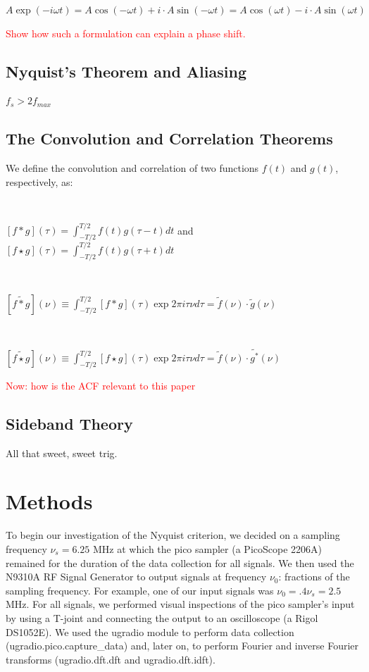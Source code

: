 \documentclass[a4paper]{article}
\begin{document}
$A\exp(-i \omega t) = A \cos(-\omega t) + i \cdot A \sin(-\omega t) = A \cos(\omega t) - i \cdot A \sin(\omega t)$

\textcolor{red}{Show how such a formulation can explain a phase shift.}

\subsection{Nyquist's Theorem and Aliasing}

$f_s > 2 f_{max}$

\subsection{The Convolution and Correlation Theorems}

We define the convolution and correlation of two functions $f(t)$ and $g(t)$, respectively, as:

\

$[f * g](\tau) = \int_{-T / 2}^{T / 2} f(t) g(\tau - t) dt$ and $[f \star g](\tau) = \int_{-T / 2}^{T / 2} f(t) g(\tau + t) dt$

\

$[\tilde{f * g}](\nu) \equiv \int_{-T / 2}^{T / 2}[f * g](\tau) \exp{2 \pi i \tau \nu} d \tau = \tilde{f}(\nu) \cdot \tilde{g}(\nu)$

\

$[\tilde{f \star g}](\nu) \equiv \int_{-T / 2}^{T / 2}[f \star g](\tau) \exp{2 \pi i \tau \nu} d \tau = \tilde{f}(\nu) \cdot \tilde{g^*}(\nu)$

\textcolor{red}{Now: how is the ACF relevant to this paper}

\subsection{Sideband Theory}

All that sweet, sweet trig.

\section{Methods}


\quad \quad To begin our investigation of the Nyquist criterion, we decided on a sampling frequency $\nu_s = 6.25$ MHz at which the pico sampler (a PicoScope 2206A) remained for the duration of the data collection for all signals. We then used the N9310A RF Signal Generator to output signals at frequency $\nu_0$: fractions of the sampling frequency. For example, one of our input signals was $\nu_0 = .4 \nu_s = 2.5$ MHz. For all signals, we performed visual inspections of the pico sampler's input by using a T-joint and connecting the output to an oscilloscope (a Rigol DS1052E). We used the ugradio module to perform data collection (ugradio.pico.capture\_data) and, later on, to perform Fourier and inverse Fourier transforms (ugradio.dft.dft and ugradio.dft.idft).
\end{document}
